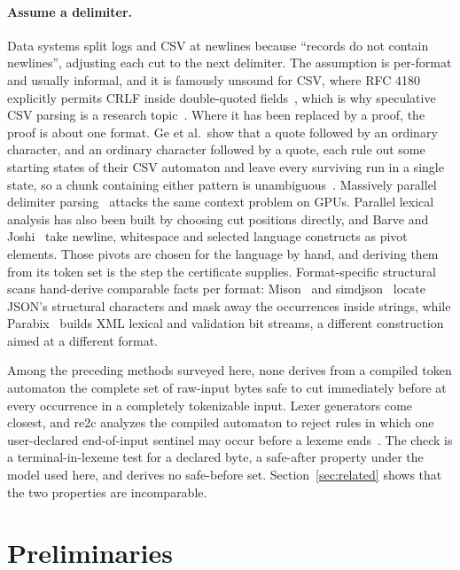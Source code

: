 \documentclass[11pt,a4paper]{article}
\theoremstyle{definition}
\theoremstyle{plain}
\begin{document}
\paragraph{Assume a delimiter.} Data systems split logs and CSV at newlines because ``records do not contain newlines'',
adjusting each cut to the next delimiter. The assumption is per-format and usually informal, and it is famously unsound
for CSV, where RFC 4180 explicitly permits CRLF inside double-quoted fields~\cite{shafranovich2005csv}, which is why
speculative CSV parsing is a research topic~\cite{ge2019csv}. Where it has been replaced by a proof, the proof is about
one format. Ge et al.\ show that a quote followed by an ordinary character, and an ordinary character followed by a
quote, each rule out some starting states of their CSV automaton and leave every surviving run in a single state, so a
chunk containing either pattern is unambiguous~\cite[Section~4.4 and Appendix~A, Property~2]{ge2019csv}. Massively
parallel delimiter parsing~\cite{stehle2020parparaw} attacks the same context problem on GPUs. Parallel lexical analysis
has also been built by choosing cut positions directly, and Barve and Joshi~\cite{barve2014parallel} take newline,
whitespace and selected language constructs as pivot elements. Those pivots are chosen for the language by hand, and
deriving them from its token set is the step the certificate supplies. Format-specific structural scans hand-derive
comparable facts per format: Mison~\cite{li2017mison} and simdjson~\cite{langdale2019simdjson} locate JSON's structural
characters and mask away the occurrences inside strings, while Parabix~\cite{cameron2008parabix} builds XML lexical and
validation bit streams, a different construction aimed at a different format.

Among the preceding methods surveyed here, none derives from a compiled token automaton the complete set of raw-input
bytes safe to cut immediately before at every occurrence in a completely tokenizable input. Lexer generators come
closest, and re2c analyzes the compiled automaton to reject rules in which one user-declared end-of-input sentinel may
occur before a lexeme ends~\cite{re2cdocs}. The check is a terminal-in-lexeme test for a declared byte, a safe-after
property under the model used here, and derives no safe-before set. Section~\ref{sec:related} shows that the two
properties are incomparable.

\section{Preliminaries}
\label{sec:prelim}
\end{document}
